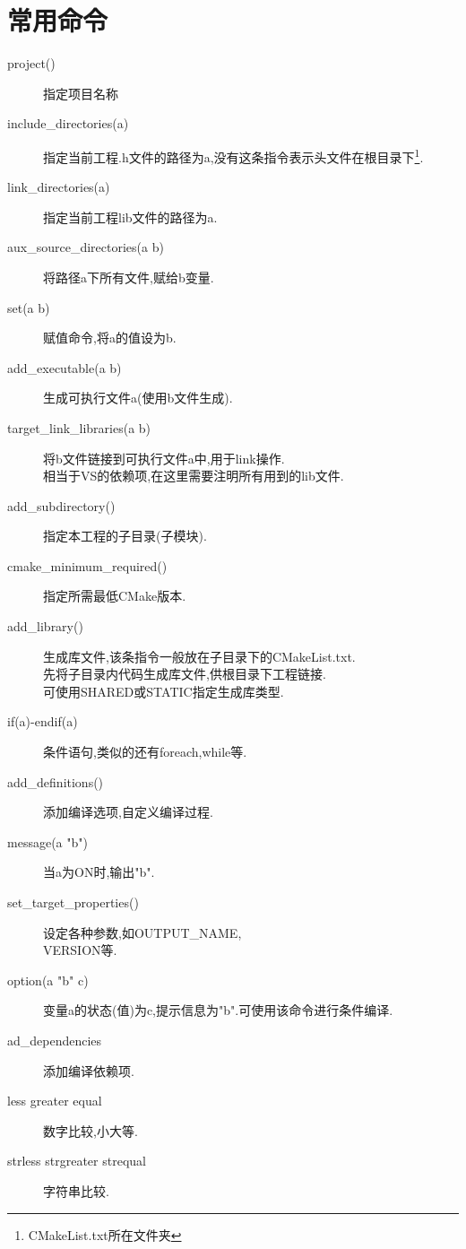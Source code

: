 \documentclass{ctexart}
\begin{document}
\section{常用命令}
\begin{description}
\item[project()] 指定项目名称
\item[include\_directories(a)] 指定当前工程.h文件的路径为a,没有这条指令表示头文件在根目录下\footnote{CMakeList.txt所在文件夹}.
\item[link\_directories(a)] 指定当前工程lib文件的路径为a.
\item[aux\_source\_directories(a b)] 将路径a下所有文件,赋给b变量.
\item[set(a b)] 赋值命令,将a的值设为b.\item[add\_executable(a b)] 生成可执行文件a(使用b文件生成).
\item[target\_link\_libraries(a b)] 将b文件链接到可执行文件a中,用于link操作.\\ 相当于VS的依赖项,在这里需要注明所有用到的lib文件.
\item[add\_subdirectory()] 指定本工程的子目录(子模块).
\item[cmake\_minimum\_required()] 指定所需最低CMake版本.
\item[add\_library()] 生成库文件,该条指令一般放在子目录下的CMakeList.txt.\\ 先将子目录内代码生成库文件,供根目录下工程链接.\\ 可使用SHARED或STATIC指定生成库类型.
\item[if(a)-endif(a)]条件语句,类似的还有foreach,while等.\
\item[add\_definitions()] 添加编译选项,自定义编译过程.
\item[message(a "b")] 当a为ON时,输出"b".
\item[set\_target\_properties()] 设定各种参数,如OUTPUT\_NAME,\\VERSION等.
\item[option(a "b" c)] 变量a的状态(值)为c,提示信息为"b".可使用该命令进行条件编译.
\item[ad\_dependencies] 添加编译依赖项.
\item[less greater equal] 数字比较,小大等.
\item[strless strgreater strequal] 字符串比较.
\end{description}
\newpage
\end{document}
